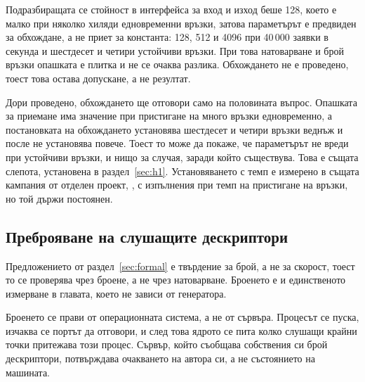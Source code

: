 
Подразбиращата се стойност в интерфейса за вход и изход беше 128, което е малко при няколко
хиляди едновременни връзки, затова параметърът е предвиден за обхождане, а не приет за
константа: 128, 512 и 4096 при 40\,000 заявки в секунда и шестдесет и четири устойчиви
връзки. При това натоварване и брой връзки опашката е плитка и не се очаква разлика.
Обхождането не е проведено, тоест това остава допускане, а не резултат.

Дори проведено, обхождането ще отговори само на половината въпрос. Опашката за приемане има
значение при пристигане на много връзки едновременно, а постановката на обхождането
установява шестдесет и четири връзки веднъж и после не установява повече. Тоест то може да
покаже, че параметърът не вреди при устойчиви връзки, и нищо за случая, заради който
съществува. Това е същата слепота, установена в раздел~\ref{sec:h1}. Установяването с темп е
измерено в същата кампания от отделен проект, , с 
изпълнения при темп на пристигане на връзки, но той държи  постоянен.

\subsection{Преброяване на слушащите дескриптори}
\label{sec:census}

Предложението от раздел~\ref{sec:formal} е твърдение за брой, а не за скорост, тоест то се
проверява чрез броене, а не чрез натоварване. Броенето е и единственото измерване в главата,
което не зависи от генератора.

Броенето се прави от операционната система, а не от сървъра. Процесът се пуска, изчаква се
портът да отговори, и след това ядрото се пита колко слушащи крайни точки притежава този
процес. Сървър, който съобщава собствения си брой дескриптори, потвърждава очакването на
автора си, а не състоянието на машината.


